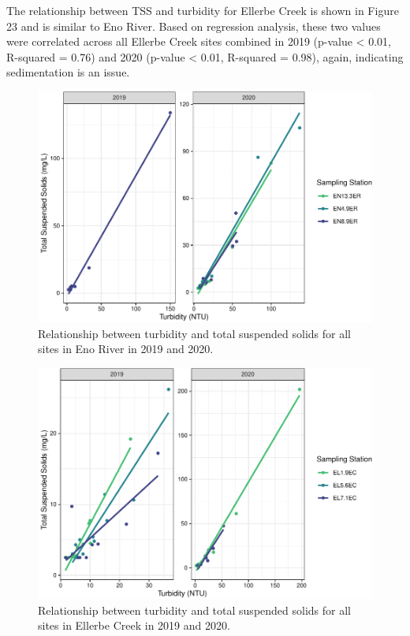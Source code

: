 \documentclass[
  12pt,
]{article}
\begin{document}
The relationship between TSS and turbidity for Ellerbe Creek is shown in
Figure 23 and is similar to Eno River. Based on regression analysis,
these two values were correlated across all Ellerbe Creek sites combined
in 2019 (p-value \textless{} 0.01, R-squared = 0.76) and 2020 (p-value
\textless{} 0.01, R-squared = 0.98), again, indicating sedimentation is
an issue.

\begin{figure}
\centering
\includegraphics{August_Lindborg_ENV872_Project_files/figure-latex/unnamed-chunk-23-1.pdf}
\caption{Relationship between turbidity and total suspended solids for
all sites in Eno River in 2019 and 2020.}
\end{figure}

\begin{figure}
\centering
\includegraphics{August_Lindborg_ENV872_Project_files/figure-latex/unnamed-chunk-24-1.pdf}
\caption{Relationship between turbidity and total suspended solids for
all sites in Ellerbe Creek in 2019 and 2020.}
\end{figure}
\end{document}
